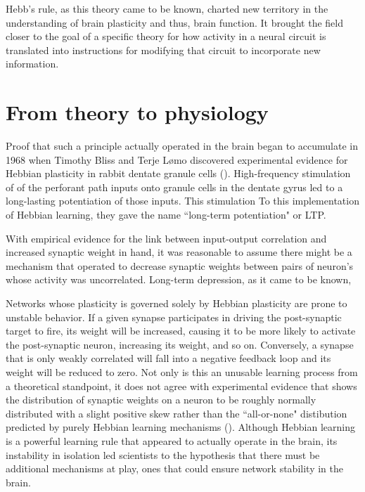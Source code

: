 Hebb's rule, as this theory came to be known, charted new territory in the understanding of brain plasticity and thus, brain function. It brought the field closer to the goal of a specific theory for how activity in a neural circuit is translated into instructions for modifying that circuit to incorporate new information.

\section{From theory to physiology}

Proof that such a principle actually operated in the brain began to accumulate in 1968 when Timothy Bliss and Terje L\o mo discovered experimental evidence for Hebbian plasticity in rabbit dentate granule cells (\cite{Bliss1973}). High-frequency stimulation of of the perforant path inputs onto granule cells in the dentate gyrus led to a long-lasting potentiation of those inputs. This stimulation To this implementation of Hebbian learning, they gave the name ``long-term potentiation" or LTP.

With empirical evidence for the link between input-output correlation and increased synaptic weight in hand, it was reasonable to assume there might be a mechanism that operated to decrease synaptic weights between pairs of neuron's whose activity was uncorrelated. Long-term depression, as it came to be known, 

Networks whose plasticity is governed solely by Hebbian plasticity are prone to unstable behavior. If a given synapse participates in driving the post-synaptic target to fire, its weight will be increased, causing it to be more likely to activate the post-synaptic neuron, increasing its weight, and so on. Conversely, a synapse that is only weakly correlated will fall into a negative feedback loop and its weight will be reduced to zero. Not only is this an unusable learning process from a theoretical standpoint, it does not agree with experimental evidence that shows the distribution of synaptic weights on a neuron to be roughly normally distributed with a slight positive skew rather than the ``all-or-none" distibution predicted by purely Hebbian learning mechanisms (\cite{Turrigiano1998}). Although Hebbian learning is a powerful learning rule that appeared to actually operate in the brain, its instability in isolation led scientists to the hypothesis that there must be additional mechanisms at play, ones that could ensure network stability in the brain.

